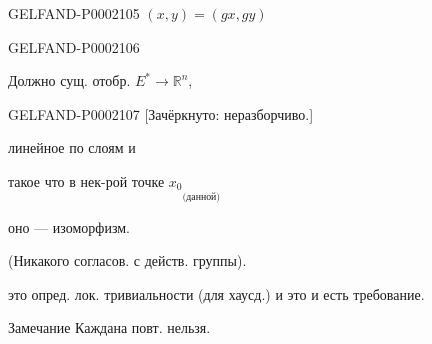 \begin{GelfandAdjacentEvidence}{GELFAND-P000210}{5}
$(x,y)=(gx,gy)$
\end{GelfandAdjacentEvidence}
\begin{GelfandAdjacentEvidence}{GELFAND-P000210}{6}




\end{GelfandAdjacentEvidence}

Должно сущ. отобр. $E^*\longrightarrow\mathbb R^n$,



\begin{GelfandAdjacentEvidence}{GELFAND-P000210}{7}
[Зачёркнуто: неразборчиво.]
\end{GelfandAdjacentEvidence}

линейное по слоям и



такое что в нек-рой точке $x_0$\quad$\underset{\text{(данной)}}{\phantom{x_0}}$



оно --- изоморфизм.



(Никакого согласов. с действ. группы).






это опред. лок. тривиальности (для хаусд.) и это и есть требование.



Замечание Каждана повт. нельзя.





